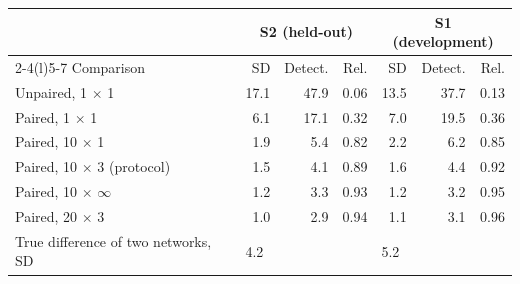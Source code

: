 \begin{tabular}{@{}lrrrrrr@{}}
\toprule
 & \multicolumn{3}{c}{S2 (held-out)} & \multicolumn{3}{c}{S1 (development)} \\
\cmidrule(lr){2-4}\cmidrule(l){5-7}
Comparison & SD & Detect. & Rel. & SD & Detect. & Rel. \\
\midrule
Unpaired, 1 $\times$ 1 & 17.1 & 47.9 & 0.06 & 13.5 & 37.7 & 0.13 \\
Paired, 1 $\times$ 1 & 6.1 & 17.1 & 0.32 & 7.0 & 19.5 & 0.36 \\
Paired, 10 $\times$ 1 & 1.9 & 5.4 & 0.82 & 2.2 & 6.2 & 0.85 \\
Paired, 10 $\times$ 3 (protocol) & 1.5 & 4.1 & 0.89 & 1.6 & 4.4 & 0.92 \\
Paired, 10 $\times$ $\infty$ & 1.2 & 3.3 & 0.93 & 1.2 & 3.2 & 0.95 \\
Paired, 20 $\times$ 3 & 1.0 & 2.9 & 0.94 & 1.1 & 3.1 & 0.96 \\
\midrule
True difference of two networks, SD & \multicolumn{3}{l}{4.2} & \multicolumn{3}{l}{5.2} \\
\bottomrule
\end{tabular}
